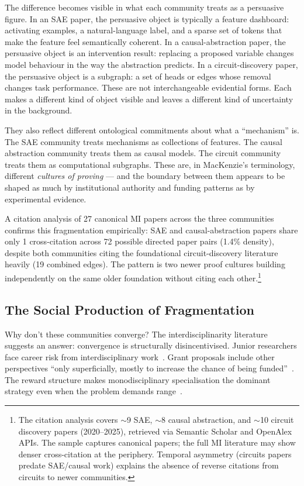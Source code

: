 \documentclass{article}
\begin{document}
The difference becomes visible in what each community treats as a persuasive figure. In an SAE paper, the persuasive object is typically a feature dashboard: activating examples, a natural-language label, and a sparse set of tokens that make the feature feel semantically coherent. In a causal-abstraction paper, the persuasive object is an intervention result: replacing a proposed variable changes model behaviour in the way the abstraction predicts. In a circuit-discovery paper, the persuasive object is a subgraph: a set of heads or edges whose removal changes task performance. These are not interchangeable evidential forms. Each makes a different kind of object visible and leaves a different kind of uncertainty in the background.

They also reflect different ontological commitments about what a ``mechanism'' is. The SAE community treats mechanisms as collections of features. The causal abstraction community treats them as causal models. The circuit community treats them as computational subgraphs. These are, in MacKenzie's terminology, different \textit{cultures of proving} --- and the boundary between them appears to be shaped as much by institutional authority and funding patterns as by experimental evidence.

A citation analysis of 27 canonical MI papers across the three communities confirms this fragmentation empirically: SAE and causal-abstraction papers share only 1 cross-citation across 72 possible directed paper pairs (1.4\% density), despite both communities citing the foundational circuit-discovery literature heavily (19 combined edges). The pattern is two newer proof cultures building independently on the same older foundation without citing each other.\footnote{The citation analysis covers $\sim$9 SAE, $\sim$8 causal abstraction, and $\sim$10 circuit discovery papers (2020--2025), retrieved via Semantic Scholar and OpenAlex APIs. The sample captures canonical papers; the full MI literature may show denser cross-citation at the periphery. Temporal asymmetry (circuits papers predate SAE/causal work) explains the absence of reverse citations from circuits to newer communities.}

\subsection{The Social Production of Fragmentation}

Why don't these communities converge? The interdisciplinarity literature suggests an answer: convergence is structurally disincentivised. Junior researchers face career risk from interdisciplinary work~\citep{leahey_prominent_2017}. Grant proposals include other perspectives ``only superficially, mostly to increase the chance of being funded''~\citep{klein_interdisciplinarity_2010}. The reward structure makes monodisciplinary specialisation the dominant strategy even when the problem demands range~\citep{epstein_range_2019}.
\end{document}
